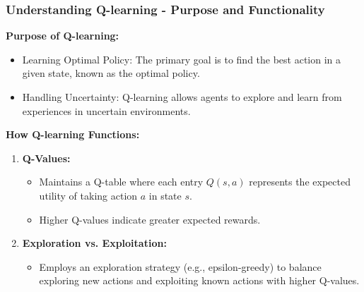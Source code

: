 \documentclass{beamer}
\begin{document}
\begin{frame}[fragile]
    \frametitle{Understanding Q-learning - Purpose and Functionality}
    \textbf{Purpose of Q-learning:}
    \begin{itemize}
        \item Learning Optimal Policy: The primary goal is to find the best action in a given state, known as the optimal policy.
        \item Handling Uncertainty: Q-learning allows agents to explore and learn from experiences in uncertain environments.
    \end{itemize}

    \textbf{How Q-learning Functions:}
    \begin{enumerate}
        \item \textbf{Q-Values:}
        \begin{itemize}
            \item Maintains a Q-table where each entry $Q(s, a)$ represents the expected utility of taking action $a$ in state $s$.
            \item Higher Q-values indicate greater expected rewards.
        \end{itemize}
        \item \textbf{Exploration vs. Exploitation:}
        \begin{itemize}
            \item Employs an exploration strategy (e.g., epsilon-greedy) to balance exploring new actions and exploiting known actions with higher Q-values.
        \end{itemize}
    \end{enumerate}
\end{frame}
\end{document}
